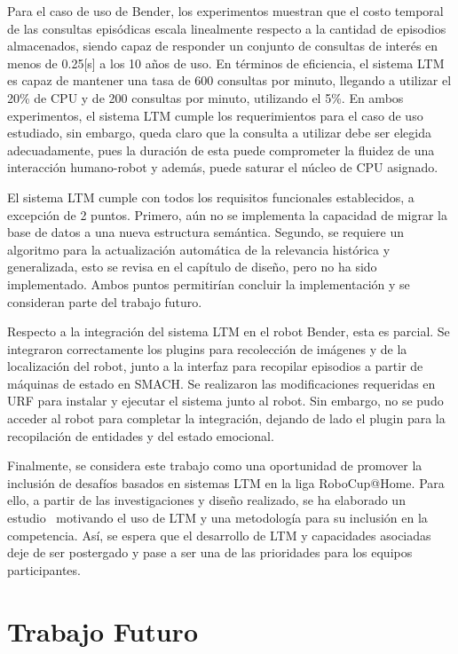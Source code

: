 \begin{conclusion}
Para el caso de uso de Bender, los experimentos muestran que el costo temporal de las consultas episódicas escala linealmente respecto a la cantidad de episodios almacenados, siendo capaz de responder un conjunto de consultas de interés en menos de 0.25[s] a los 10 años de uso. En términos de eficiencia, el sistema LTM es capaz de mantener una tasa de 600 consultas por minuto, llegando a utilizar el 20\% de CPU y de 200 consultas por minuto, utilizando el 5\%. En ambos experimentos, el sistema LTM cumple los requerimientos para el caso de uso estudiado, sin embargo, queda claro que la consulta a utilizar debe ser elegida adecuadamente, pues la duración de esta puede comprometer la fluidez de una interacción humano-robot y además, puede saturar el núcleo de CPU asignado.

El sistema LTM cumple con todos los requisitos funcionales establecidos, a excepción de 2 puntos. Primero, aún no se implementa la capacidad de migrar la base de datos a una nueva estructura semántica. Segundo, se requiere un algoritmo para la actualización automática de la relevancia histórica y generalizada, esto se revisa en el capítulo de diseño, pero no ha sido implementado. Ambos puntos permitirían concluir la implementación y se consideran parte del trabajo futuro.

Respecto a la integración del sistema LTM en el robot Bender, esta es parcial. Se integraron correctamente los plugins para recolección de imágenes y de la localización del robot, junto a la interfaz para recopilar episodios a partir de máquinas de estado en SMACH. Se realizaron las modificaciones requeridas en URF para instalar y ejecutar el sistema junto al robot. Sin embargo, no se pudo acceder al robot para completar la integración, dejando de lado el plugin para la recopilación de entidades y del estado emocional.

Finalmente, se considera este trabajo como una oportunidad de promover la inclusión de desafíos basados en sistemas LTM en la liga RoboCup@Home. Para ello, a partir de las investigaciones y diseño realizado, se ha elaborado un estudio~\cite{ltm_in_robocup} motivando el uso de LTM y una metodología para su inclusión en la competencia. Así, se espera que el desarrollo de LTM y capacidades asociadas deje de ser postergado y pase a ser una de las prioridades para los equipos participantes.


\section*{Trabajo Futuro}


\end{conclusion}
